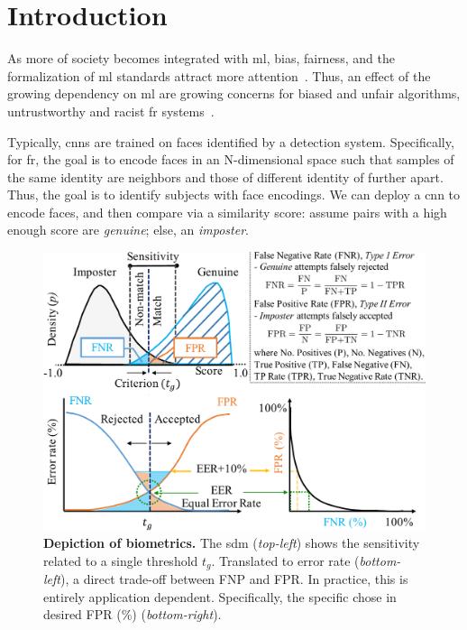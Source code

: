 
\glsresetall
\section{Introduction}
    As more of society becomes integrated with \gls{ml}, bias, fairness, and the formalization of \gls{ml} standards attract more attention~\cite{10.1007/978-3-030-13469-3_68, anne2018women, wang2018racial}. Thus, an effect of the growing dependency on \gls{ml} are growing concerns for biased and unfair algorithms, \eg untrustworthy and racist \gls{fr} systems~\cite{england2019,snow2018}.
    


    Typically, \glspl{cnn} are trained on faces identified by a detection system. Specifically, for \gls{fr}, the goal is to encode faces in an N-dimensional space such that samples of the same identity are neighbors and those of different identity of further apart. Thus, the goal is to identify subjects with face encodings. We can deploy a \gls{cnn} to encode faces, and then compare via a similarity score: assume pairs with a high enough score are \emph{genuine}; else, an \emph{imposter}. 

\begin{figure}
    \centering
    \includegraphics[width=\linewidth]{figures/fig1-crop.pdf}
    \caption{\small{\textbf{Depiction of biometrics.} The \gls{sdm} (\emph{top-left}) shows the sensitivity related to a single threshold $t_g$. Translated to error rate (\emph{bottom-left}), a direct trade-off between FNP and FPR. In practice, this is entirely application dependent. Specifically, the specific chose in desired FPR (\%) (\emph{bottom-right}).}}
    \label{fig:biometrics}
\end{figure}
    
